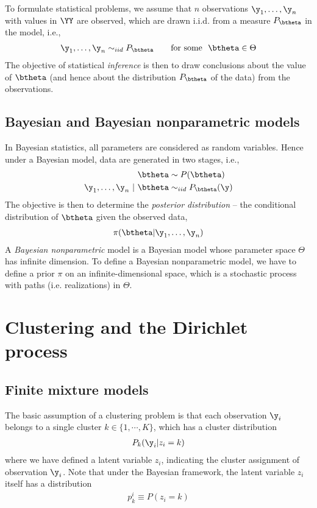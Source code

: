 \documentclass{book}
\begin{document}
To formulate statistical problems, we assume that $n$ observations $\y_1,\dots,\y_n$ with values in $\YY$ are observed, which are drawn i.i.d. from a measure $P_\btheta$ in the model, i.e.,
\begin{align}
\y_1, \dots, \y_n \sim_{iid} P_\btheta \qquad \text{for some}~~ \btheta \in \Theta
\end{align}
The objective of statistical {\em{inference}} is then to draw conclusions about the value of $\btheta$ (and hence about the distribution $P_\btheta$ of the data) from the observations.


\subsection{Bayesian and Bayesian nonparametric models}
In Bayesian statistics, all parameters are considered as random variables. Hence under a Bayesian model, data are generated in two stages, i.e.,
\begin{align}
\btheta &\sim P(\btheta)\\
\y_1, \dots, \y_n ~|~ \btheta &\sim_{iid} P_\btheta(\y)
\end{align}
The objective is then to determine the {\em{posterior distribution}} -- the conditional distribution of $\btheta$ given the observed data,
\begin{align}
\pi(\btheta | \y_1, \dots, \y_n)
\end{align}
A {\em{Bayesian nonparametric}} model is a Bayesian model whose parameter space $\Theta$ has infinite dimension. To define a Bayesian nonparametric model, we have to define a prior $\pi$ on an infinite-dimensional space, which is a stochastic process with paths (i.e. realizations) in $\Theta$.

\section{Clustering and the Dirichlet process}
\subsection{Finite mixture models}
The basic assumption of a clustering problem is that each observation $\y_i$ belongs to a single cluster $k \in \{1,\cdots, K\}$, which has a cluster distribution
\begin{align}
P_k(\y_i | z_i = k)
\end{align}
where we have defined a latent variable $z_i$, indicating the cluster assignment of observation $\y_i$. Note that under the Bayesian framework, the latent variable $z_i$ itself has a distribution
\begin{align}
p_k^i \equiv P(z_i = k)
\end{align}
\end{document}
